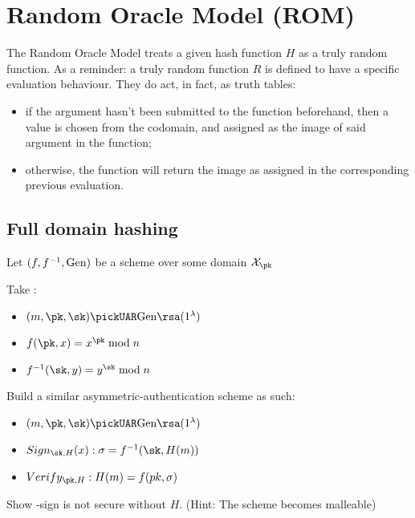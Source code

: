 
\section{Random Oracle Model (ROM)}

The Random Oracle Model treats a given hash function $H$ as a truly random function. As a reminder: a truly random function $R$ is defined to have a specific evaluation behaviour. They do act, in fact, as truth tables\footnotemark:

\begin{itemize}
    \item if the argument hasn't been submitted to the function beforehand, then a value is chosen \uar{} from the codomain, and assigned as the image of said argument in the function;
    \item otherwise, the function will return the image as assigned in the corresponding previous evaluation.
\end{itemize}


\subsection{Full domain hashing}

Let $(f, f^{-1}, \mathrm{Gen})$ be a \tdp{} scheme over some domain $\X_{\pk}$

Take \rsa:
\begin{itemize}
    \item $(m, \pk, \sk) \pickUAR \Gen\rsa(1^\lambda)$
    \item $f(\pk, x) = x^{\pk} \mod n$
    \item $f^{-1}(\sk, y) = y^{\sk} \mod n$
\end{itemize}

Build a similar asymmetric-authentication scheme as such:

\begin{itemize}
    \item $(m, \pk, \sk) \pickUAR \Gen\rsa(1^\lambda)$
    \item $Sign_{\sk, H}(x): \sigma = f^{-1}(\sk, H(m))$
    \item $Verify_{\pk, H}: H(m) = f(pk, \sigma)$
\end{itemize}

\begin{exercise}
    Show \rsa-sign is not secure without $H$. (Hint: The scheme becomes malleable)
\end{exercise}

